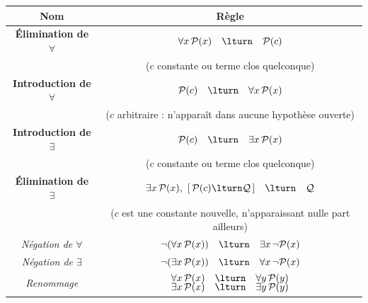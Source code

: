 \documentclass[11pt,class=report,crop=false]{standalone}
\begin{document}
\begin{center}
    \setlength{\tabcolsep}{16pt}
    \renewcommand{\arraystretch}{1.6}
    \begin{tabular}{|c|c|}
        \hline
        \textbf{Nom} & \textbf{Règle} \\
        \hline

        \textbf{Élimination de $\forall$}
        &
        $\forall x\,\mathcal P(x)
        \quad \lturn \quad
        \mathcal P(c)$
        \\[-0.7em]
        &
        {\small ($c$ constante ou terme clos quelconque)}
        \\ \hline

        \textbf{Introduction de $\forall$}
        &
        $\mathcal P(c)
        \quad \lturn \quad
        \forall x\,\mathcal P(x)$
        \\[-0.7em]
        &
        {\small ($c$ arbitraire : n'apparaît dans aucune hypothèse ouverte)}
        \\ \hline

        \textbf{Introduction de $\exists$}
        &
        $\mathcal P(c)
        \quad \lturn \quad
        \exists x\,\mathcal P(x)$
        \\[-0.7em]
        &
        {\small ($c$ constante ou terme clos quelconque)}
        \\ \hline

        \textbf{Élimination de $\exists$}
        &
        $\begin{array}{c}
            \exists x\,\mathcal P(x),\
            [\,\mathcal P(c)\lturn\mathcal Q\,]
            \quad \lturn \quad
            \mathcal Q
        \end{array}$
        \\[-0.7em]
        &
        {\small ($c$ est une constante nouvelle, n'apparaissant nulle part ailleurs)}
        \\ \hline

        \emph{Négation de $\forall$}
        &
        $\lnot(\forall x\,\mathcal P(x))
        \quad \lturn \quad
        \exists x\,\lnot\mathcal P(x)$
        \\ \hline

        \emph{Négation de $\exists$}
        &
        $\lnot(\exists x\,\mathcal P(x))
        \quad \lturn \quad
        \forall x\,\lnot\mathcal P(x)$
        \\ \hline

        \emph{Renommage}
        &
        $\begin{array}{c}
            \forall x\,\mathcal P(x)
            \quad \lturn \quad
            \forall y\,\mathcal P(y)\\[-0.3em]
            \exists x\,\mathcal P(x)
            \quad \lturn \quad
            \exists y\,\mathcal P(y)
        \end{array}$
        \\ \hline


\end{tabular}
\end{center}
\end{document}
